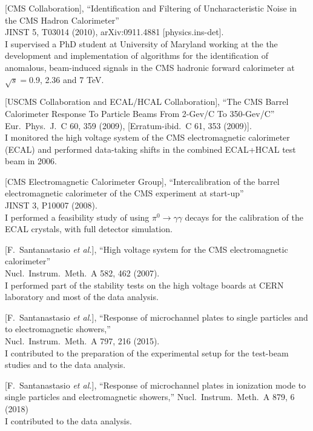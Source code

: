 \documentclass[10pt, a4paper]{article}
\begin{document}
\begin{thebibliography}{599}
[CMS Collaboration],
 ``Identification and Filtering of Uncharacteristic Noise in the CMS Hadron Calorimeter''\\
  JINST 5, T03014 (2010), arXiv:0911.4881 [physics.ins-det].\\
I supervised a PhD student at University of Maryland working at the
the development and implementation of algorithms for the
identification of anomalous, beam-induced signals in the CMS hadronic 
forward calorimeter at $\sqrt{s}=$0.9, 2.36 and 7 TeV.

[USCMS Collaboration and ECAL/HCAL Collaboration],
``The CMS Barrel Calorimeter Response To Particle Beams From 2-Gev/C To 350-Gev/C''\\
Eur.\ Phys.\ J.\  C 60, 359 (2009), [Erratum-ibid.\  C 61, 353 (2009)].\\
I monitored the high voltage system of the CMS electromagnetic
calorimeter (ECAL) and performed data-taking shifts in the combined ECAL+HCAL test beam in 2006.

[CMS Electromagnetic Calorimeter Group],
``Intercalibration of the barrel electromagnetic calorimeter of the CMS  experiment at start-up''\\
JINST 3, P10007 (2008).
\\ I performed a feasibility study of using $\pi^0 \rightarrow \gamma \gamma$ decays for the calibration of the ECAL crystals, with full detector simulation.

 [F.~Santanastasio {\it et al.}],
``High voltage system for the CMS electromagnetic calorimeter''\\
 Nucl.\ Instrum.\ Meth.\  A 582, 462 (2007).
 \\ I performed part of the stability tests on the high voltage boards at CERN laboratory and most of the data analysis. 

[F.~Santanastasio {\it et al.}],
  ``Response of microchannel plates to single particles and to electromagnetic showers,''\\
Nucl.\ Instrum.\ Meth.\ A 797, 216 (2015).\\
I contributed to the preparation of the experimental setup for the
test-beam studies and to the data analysis.

[F.~Santanastasio {\it et al.}],
  ``Response of microchannel plates in ionization mode to single particles and electromagnetic showers,''
  Nucl.\ Instrum.\ Meth.\ A  879, 6 (2018)\\
I contributed to the data analysis.


\end{thebibliography}
\end{document}
